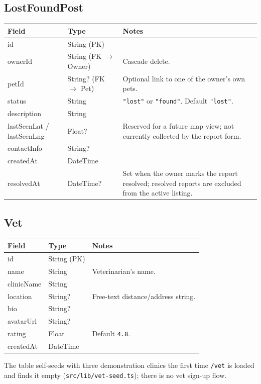 \documentclass[11pt,a4paper]{article}
\makeatletter
\newcommand{\modeltable}[1]{%
  \begin{tabular}{@{}p{3.3cm}p{2.6cm}p{8.3cm}@{}}
  \toprule
  \textbf{Field} & \textbf{Type} & \textbf{Notes} \\
  \midrule
  #1
  \bottomrule
  \end{tabular}
}
\makeatother
\begin{document}
\subsection{LostFoundPost}
\modeltable{
id & String (PK) & \\
ownerId & String (FK $\to$ Owner) & Cascade delete. \\
petId & String? (FK $\to$ Pet) & Optional link to one of the owner's own pets. \\
status & String & \texttt{"lost"} or \texttt{"found"}. Default \texttt{"lost"}. \\
description & String & \\
lastSeenLat / lastSeenLng & Float? & Reserved for a future map view; not currently
  collected by the report form. \\
contactInfo & String? & \\
createdAt & DateTime & \\
resolvedAt & DateTime? & Set when the owner marks the report resolved; resolved
  reports are excluded from the active listing. \\
}

\subsection{Vet}
\modeltable{
id & String (PK) & \\
name & String & Veterinarian's name. \\
clinicName & String & \\
location & String? & Free-text distance/address string. \\
bio & String? & \\
avatarUrl & String? & \\
rating & Float & Default \texttt{4.8}. \\
createdAt & DateTime & \\
}
The table self-seeds with three demonstration clinics the first time
\texttt{/vet} is loaded and finds it empty (\texttt{src/lib/vet-seed.ts}); there is no
vet sign-up flow.
\end{document}

